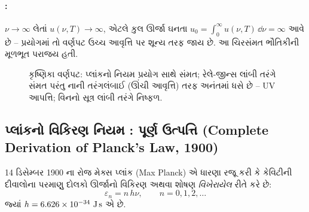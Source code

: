 \paragraph{:} $\nu\to\infty$ લેતાં
$u(\nu,T)\to\infty$, એટલે કુલ ઊર્જા ઘનતા
$u_0=\int_0^\infty u(\nu,T)\,\dd\nu=\infty$ આવે છે -- પ્રયોગમાં તો વર્ણપટ ઉચ્ચ આવૃત્તિ પર શૂન્ય તરફ
જાય છે. આ ચિરસંમત ભૌતિકીની મૂળભૂત પરાજય હતી.

\begin{figure}[ht]
\centering
{}
\caption{કૃષ્ણિકા વર્ણપટ: પ્લાંકનો નિયમ પ્રયોગ સાથે સંમત; રેલે-જીન્સ લાંબી તરંગે સંમત
પરંતુ નાની તરંગલંબાઈ (ઊંચી આવૃત્તિ) તરફ અનંતમાં ધસે છે -- UV આપત્તિ; વિનનો સૂત્ર લાંબી તરંગે નિષ્ફળ.}
\label{fig:blackbody}
\end{figure}

\subsection{પ્લાંકનો વિકિરણ નિયમ : પૂર્ણ ઉત્પત્તિ (Complete Derivation of Planck's Law, 1900)}

\begin{pramey}[પ્લાંકની ક્વોન્ટમ ધારણા]
14 ડિસેમ્બર 1900 ના રોજ મેક્સ પ્લાંક (Max Planck) એ ધારણા રજૂ કરી કે કેવિટીની દીવાલોના પરમાણુ
દોલકો ઊર્જાનો વિકિરણ અથવા શોષણ \emph{વિખેરાયેલ} રીતે કરે છે:
\begin{equation}
  \varepsilon_n = n\,h\nu, \qquad n=0,1,2,\dots
\end{equation}
જ્યાં $\hh = 6.626\times10^{-34}\ \mathrm{J\,s}$ એ  છે.
\end{pramey}

